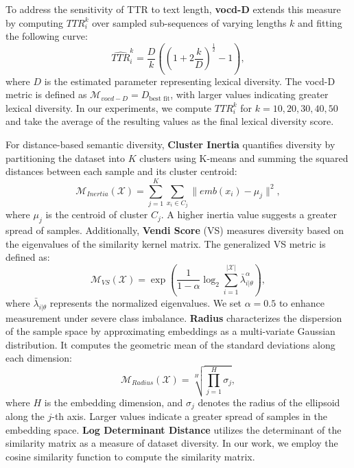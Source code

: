 To address the sensitivity of TTR to text length, \textbf{vocd-D} extends this measure by computing $TTR_i^k$ over sampled sub-sequences of varying lengths $k$ and fitting the following curve:  
\begin{equation}  
    \hat{TTR}_i^k = \frac{D}{k} \left( (1 + 2 \frac{k}{D})^{\frac{1}{2}} - 1 \right),  
\end{equation}  
where $D$ is the estimated parameter representing lexical diversity. The vocd-D metric is defined as $\mathcal{M}_{vocd-D} = D_{\text{best fit}}$, with larger values indicating greater lexical diversity. In our experiments, we compute $TTR_i^k$ for $k = 10, 20, 30, 40, 50$ and take the average of the resulting values as the final lexical diversity score. 

For distance-based semantic diversity, 
\textbf{Cluster Inertia} \cite{du2019boosting-Inertia} quantifies diversity by partitioning the dataset into $K$ clusters using K-means and summing the squared distances between each sample and its cluster centroid:  
\begin{equation}  
    \mathcal{M}_{Inertia}(\mathcal{X}) = \sum_{j=1}^{K} \sum_{x_i \in C_j} \|emb(x_i) - \mu_j\|^2,  
\end{equation}  
where $\mu_j$ is the centroid of cluster $C_j$. A higher inertia value suggests a greater spread of samples.  
Additionally, \textbf{Vendi Score} (VS) \cite{pasarkar2023cousins-Vendi} measures diversity based on the eigenvalues of the similarity kernel matrix. The generalized VS metric is defined as:  
\begin{equation}  
    \mathcal{M}_{VS}(\mathcal{X}) = \exp\left(\frac{1}{1 - \alpha} \log_2 \sum_{i=1}^{|\mathcal{X}|} \bar{\lambda}_{i|\theta}^{\alpha} \right),  
\end{equation}  
where $\bar{\lambda}_{i|\theta}$ represents the normalized eigenvalues. We set $\alpha=0.5$ to enhance measurement under severe class imbalance.
\textbf{Radius} \cite{lai2020diversity-Radius} characterizes the dispersion of the sample space by approximating embeddings as a multi-variate Gaussian distribution. It computes the geometric mean of the standard deviations along each dimension:  
\begin{equation}  
    \mathcal{M}_{Radius}(\mathcal{X}) = \sqrt[H]{\prod_{j=1}^{H} \sigma_j},  
\end{equation}  
where $H$ is the embedding dimension, and $\sigma_j$ denotes the radius of the ellipsoid along the $j$-th axis. Larger values indicate a greater spread of samples in the embedding space. \textbf{Log Determinant Distance} \cite{wang2024diversity-logD} utilizes the determinant of the similarity matrix as a measure of dataset diversity. In our work, we employ the cosine similarity function to compute the similarity matrix. 

